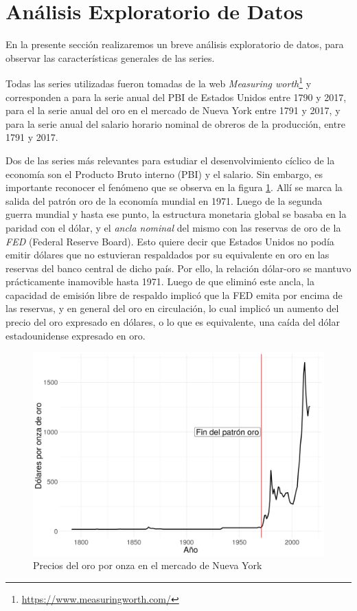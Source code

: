 \documentclass[a4paper]{article}
\begin{document}
\section{Análisis Exploratorio de Datos}

En la presente sección realizaremos un breve análisis exploratorio de datos, para observar las características generales de las series.

Todas las series utilizadas fueron tomadas de la web \textit{Measuring worth}\footnote{\url{https://www.measuringworth.com/}} y corresponden a \cite{officer2018gdp} para la serie anual del PBI de Estados Unidos entre 1790 y 2017, \cite{officer2018gold} para el la serie anual del oro en el mercado de Nueva York entre 1791 y 2017, y \cite{officer2018wage} para la serie anual del salario horario nominal de obreros de la producción, entre 1791 y 2017.
 
Dos de las series más relevantes para estudiar el desenvolvimiento cíclico de la economía son el Producto Bruto interno (PBI) y el salario. Sin embargo, es importante reconocer el fenómeno que se observa en la figura \ref{fig:oro}. Allí se marca la salida del patrón oro de la economía mundial en 1971. Luego de la segunda guerra mundial y hasta ese punto, la estructura monetaria global se basaba en la paridad con el dólar, y el \textit{ancla nominal} del mismo con las reservas de oro de la \textit{FED} (Federal Reserve Board). Esto quiere decir que Estados Unidos no podía emitir dólares que no estuvieran respaldados por su equivalente en oro en las reservas del banco central de dicho país. Por ello, la relación dólar-oro se mantuvo prácticamente inamovible hasta 1971. Luego de que eliminó este ancla, la capacidad de emisión libre de respaldo implicó que la FED emita por encima de las reservas, y en general del oro en circulación, lo cual implicó un aumento del precio del oro expresado en dólares, o lo que es equivalente, una caída del dólar estadounidense expresado en oro.

\begin{figure}[H]
	\centering
	\includegraphics[width=0.8\linewidth]{oro.png}
	\caption{Precios del oro por onza en el mercado de Nueva York} \label{fig:oro}
\end{figure}
\end{document}
